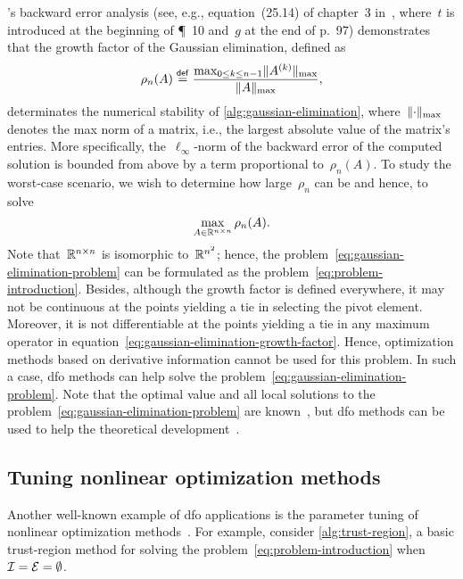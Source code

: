 's backward error analysis (see, e.g., equation~(25.14) of chapter~3 in~\cite{Wilkinson_1963}, where~$t$ is introduced at the beginning of \P~10 and~$g$ at the end of p.~97) demonstrates that the growth factor of the Gaussian elimination, defined as
\begin{equation}
    \label{eq:gaussian-elimination-growth-factor}
    \rho_n(A) \mathrel{\stackrel{\mathsf{def}}{=}} \frac{\max_{0 \le k \le n - 1} \lVert A^{(k)}\rVert_{\max}}{\lVert A\rVert_{\max}},
\end{equation}
determinates the numerical stability of \cref{alg:gaussian-elimination}, where~$\lVert\cdot\rVert_{\max}$ denotes the max norm of a matrix, i.e., the largest absolute value of the matrix's entries.
More specifically, the~$\ell_{\infty}$-norm of the backward error of the computed solution is bounded from above by a term proportional to~$\rho_n(A)$.
To study the worst-case scenario, we wish to determine how large~$\rho_n$ can be and hence, to solve
\begin{equation}
    \label{eq:gaussian-elimination-problem}
    \max_{A \in \mathbb{R}^{n \times n}} \rho_n(A).
\end{equation}
Note that~$\mathbb{R}^{n \times n}$ is isomorphic to~$\mathbb{R}^{n^2}$; hence, the problem~\cref{eq:gaussian-elimination-problem} can be formulated as the problem~\cref{eq:problem-introduction}.
Besides, although the growth factor is defined everywhere, it may not be continuous at the points yielding a tie in selecting the pivot element.
Moreover, it is not differentiable at the points yielding a tie in any maximum operator in equation~\cref{eq:gaussian-elimination-growth-factor}.
Hence, optimization methods based on derivative information cannot be used for this problem.
In such a case, \gls{dfo} methods can help solve the problem~\cref{eq:gaussian-elimination-problem}.
Note that the optimal value and all local solutions to the problem~\cref{eq:gaussian-elimination-problem} are known~\cite{Higham_Higham_1989}, but \gls{dfo} methods can be used to help the theoretical development~\cite{Higham_1993}.

\subsection{Tuning nonlinear optimization methods}
\label{subsec:tuning-nonlinear-optimization-methods}

Another well-known example of \gls{dfo} applications is the parameter tuning of nonlinear optimization methods~\cite{Audet_Orban_2006}.
For example, consider \cref{alg:trust-region}, a basic trust-region method for solving the problem~\cref{eq:problem-introduction} when~$\mathcal{I} = \mathcal{E} = \emptyset$.

